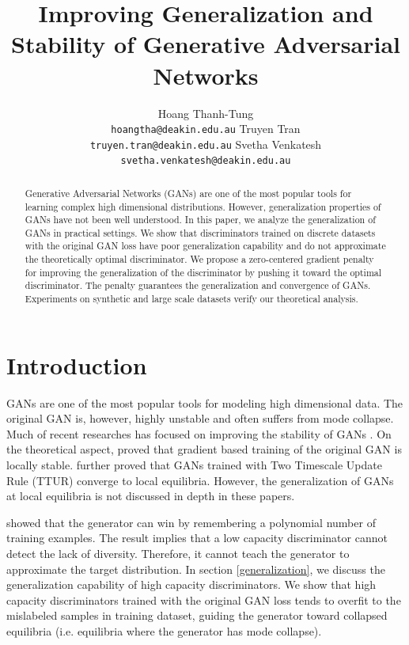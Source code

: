 \documentclass{article} %
\title{Improving Generalization and Stability of Generative Adversarial Networks}
\author{Hoang Thanh-Tung \\
\texttt{hoangtha@deakin.edu.au} \And
Truyen Tran \\
\texttt{truyen.tran@deakin.edu.au} \And
Svetha Venkatesh \\
\texttt{svetha.venkatesh@deakin.edu.au}
}
\begin{document}
\maketitle

\begin{abstract}
Generative Adversarial Networks (GANs) are one of the most popular tools for learning complex high dimensional distributions. However, generalization properties of GANs have not been well understood. In this paper, we analyze the generalization of GANs in practical settings. We show that discriminators trained on discrete datasets with the original GAN loss have poor generalization capability and do not approximate the theoretically optimal discriminator. We propose a zero-centered gradient penalty for improving the generalization of the discriminator by pushing it toward the optimal discriminator. The penalty guarantees the generalization and convergence of GANs. Experiments on synthetic and large scale datasets verify our theoretical analysis.
\end{abstract}

\section{Introduction}
GANs \citep{gan} are one of the most popular tools for modeling high dimensional data. The original GAN is, however, highly unstable and often suffers from mode collapse. Much of recent researches has focused on improving the stability of GANs  \citep{dcgan, wgan, ttur, spectralNorm, progressiveGAN}. On the theoretical aspect, \cite{ganStable} proved that gradient based training of the original GAN is locally stable. \cite{ttur} further proved that GANs trained with Two Timescale Update Rule (TTUR) converge to local equilibria. However, the generalization of GANs at local equilibria is not discussed in depth in these papers.

\cite{equiAndGeneralization} showed that the generator can win by remembering a polynomial number of training examples. The result implies that a low capacity discriminator cannot detect the lack of diversity. Therefore, it cannot teach the generator to approximate the target distribution. In section \ref{generalization}, we discuss the generalization capability of high capacity discriminators. We show that high capacity discriminators trained with the original GAN loss tends to overfit to the mislabeled samples in training dataset, guiding the generator toward collapsed equilibria (i.e. equilibria where the generator has mode collapse). 
\end{document}
